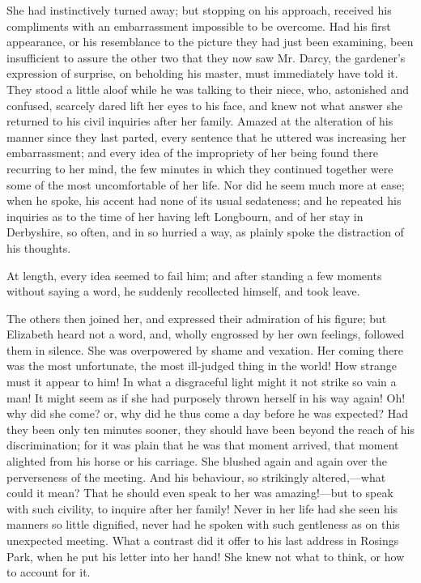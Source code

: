 She had instinctively turned away; but stopping on his approach, received his compliments with an embarrassment impossible to be overcome. Had his first appearance, or his resemblance to the picture they had just been examining, been insufficient to assure the other two that they now saw Mr. Darcy, the gardener's expression of surprise, on beholding his master, must immediately have told it. They stood a little aloof while he was talking to their niece, who, astonished and confused, scarcely dared lift her eyes to his face, and knew not what answer she returned to his civil inquiries after her family. Amazed at the alteration of his manner since they last parted, every sentence that he uttered was increasing her embarrassment; and every idea of the impropriety of her being found there recurring to her mind, the few minutes in which they continued together were some of the most uncomfortable of her life. Nor did he seem much more at ease; when he spoke, his accent had none of its usual sedateness; and he repeated his inquiries as to the time of her having left Longbourn, and of her stay in Derbyshire, so often, and in so hurried a way, as plainly spoke the distraction of his thoughts.

At length, every idea seemed to fail him; and after standing a few moments without saying a word, he suddenly recollected himself, and took leave.

The others then joined her, and expressed their admiration of his figure; but Elizabeth heard not a word, and, wholly engrossed by her own feelings, followed them in silence. She was overpowered by shame and vexation. Her coming there was the most unfortunate, the most ill-judged thing in the world! How strange must it appear to him! In what a disgraceful light might it not strike so vain a man! It might seem as if she had purposely thrown herself in his way again! Oh! why did she come? or, why did he thus come a day before he was expected? Had they been only ten minutes sooner, they should have been beyond the reach of his discrimination; for it was plain that he was that moment arrived, that moment alighted from his horse or his carriage. She blushed again and again over the perverseness of the meeting. And his behaviour, so strikingly altered,---what could it mean? That he should even speak to her was amazing!---but to speak with such civility, to inquire after her family! Never in her life had she seen his manners so little dignified, never had he spoken with such gentleness as on this unexpected meeting. What a contrast did it offer to his last address in Rosings Park, when he put his letter into her hand! She knew not what to think, or how to account for it.

